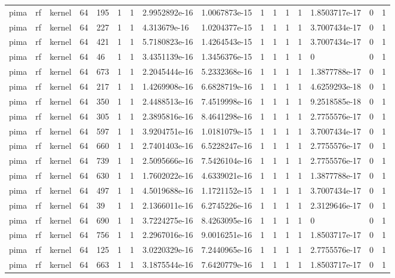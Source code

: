 \begin{tabular}{llllllllllllllll}
pima & rf & kernel & 64 & 195 & 1 & 1 & 2.9952892e-16 & 1.0067873e-15 & 1 & 1 & 1 & 1 & 1.8503717e-17 & 0 & 1 \\
pima & rf & kernel & 64 & 227 & 1 & 1 & 4.313679e-16 & 1.0204377e-15 & 1 & 1 & 1 & 1 & 3.7007434e-17 & 0 & 1 \\
pima & rf & kernel & 64 & 421 & 1 & 1 & 5.7180823e-16 & 1.4264543e-15 & 1 & 1 & 1 & 1 & 3.7007434e-17 & 0 & 1 \\
pima & rf & kernel & 64 & 46 & 1 & 1 & 3.4351139e-16 & 1.3456376e-15 & 1 & 1 & 1 & 1 & 0 & 0 & 1 \\
pima & rf & kernel & 64 & 673 & 1 & 1 & 2.2045444e-16 & 5.2332368e-16 & 1 & 1 & 1 & 1 & 1.3877788e-17 & 0 & 1 \\
pima & rf & kernel & 64 & 217 & 1 & 1 & 1.4269908e-16 & 6.6828719e-16 & 1 & 1 & 1 & 1 & 4.6259293e-18 & 0 & 1 \\
pima & rf & kernel & 64 & 350 & 1 & 1 & 2.4488513e-16 & 7.4519998e-16 & 1 & 1 & 1 & 1 & 9.2518585e-18 & 0 & 1 \\
pima & rf & kernel & 64 & 305 & 1 & 1 & 2.3895816e-16 & 8.4641298e-16 & 1 & 1 & 1 & 1 & 2.7755576e-17 & 0 & 1 \\
pima & rf & kernel & 64 & 597 & 1 & 1 & 3.9204751e-16 & 1.0181079e-15 & 1 & 1 & 1 & 1 & 3.7007434e-17 & 0 & 1 \\
pima & rf & kernel & 64 & 660 & 1 & 1 & 2.7401403e-16 & 6.5228247e-16 & 1 & 1 & 1 & 1 & 2.7755576e-17 & 0 & 1 \\
pima & rf & kernel & 64 & 739 & 1 & 1 & 2.5095666e-16 & 7.5426104e-16 & 1 & 1 & 1 & 1 & 2.7755576e-17 & 0 & 1 \\
pima & rf & kernel & 64 & 630 & 1 & 1 & 1.7602022e-16 & 4.6339021e-16 & 1 & 1 & 1 & 1 & 1.3877788e-17 & 0 & 1 \\
pima & rf & kernel & 64 & 497 & 1 & 1 & 4.5019688e-16 & 1.1721152e-15 & 1 & 1 & 1 & 1 & 3.7007434e-17 & 0 & 1 \\
pima & rf & kernel & 64 & 39 & 1 & 1 & 2.1366011e-16 & 6.2745226e-16 & 1 & 1 & 1 & 1 & 2.3129646e-17 & 0 & 1 \\
pima & rf & kernel & 64 & 690 & 1 & 1 & 3.7224275e-16 & 8.4263095e-16 & 1 & 1 & 1 & 1 & 0 & 0 & 1 \\
pima & rf & kernel & 64 & 756 & 1 & 1 & 2.2967016e-16 & 9.0016251e-16 & 1 & 1 & 1 & 1 & 1.8503717e-17 & 0 & 1 \\
pima & rf & kernel & 64 & 125 & 1 & 1 & 3.0220329e-16 & 7.2440965e-16 & 1 & 1 & 1 & 1 & 2.7755576e-17 & 0 & 1 \\
pima & rf & kernel & 64 & 663 & 1 & 1 & 3.1875544e-16 & 7.6420779e-16 & 1 & 1 & 1 & 1 & 1.8503717e-17 & 0 & 1 \\

\end{tabular}
